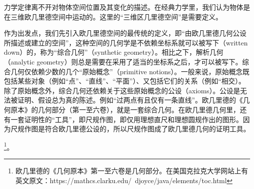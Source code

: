 \documentclass[main.tex]{subfiles}
\begin{document}
力学定律离不开对物体空间位置及其变化的描述。在经典力学里，我们认为物体是在三维欧几里德空间中运动的。这里的“三维区几里德空间”是需要定义。

作为出发点，我们先引入欧几里德空间的最传统的定义，即“由欧几里德几何公设所描述或建立的空间”，这种空间的几何学是不依赖坐标系就可以被写下（written down）的，称为“综合几何”（synthetic geometry）。相比之下，解析几何（analytic geometry）则总是需要在采用了适当的坐标系之后，才可以被写下。综合几何仅依赖少数的几个“原始概念”（primitive notions）。一般来说，原始概念既包括某些对象（例如“点”、“直线”、“平面”）、又包括它们的关系（例如“相交）。除了原始概念外，综合几何还依赖关于这些原始概念的公设（axioms）。公设是无法被证明、假设总为真的陈述。例如“过两点有且仅有一条直线”。欧几里德的《几何原本》的几何部分（第一至六卷），就是一套综合几何。在欧几里德几何里，还有一套证明性的“工具”，即尺规作图，即仅用理想直尺和理想圆规作出的图形。因为尺规作图是符合欧几里德公设的，所以尺规作图成了欧几里德几何的证明工具。

\footnote{欧几里德的《几何原本》第一至六卷是几何部分。在美国克拉克大学网站上有英文原文：https://mathcs.clarku.edu/~djoyce/java/elements/toc.html}。
\end{document}
